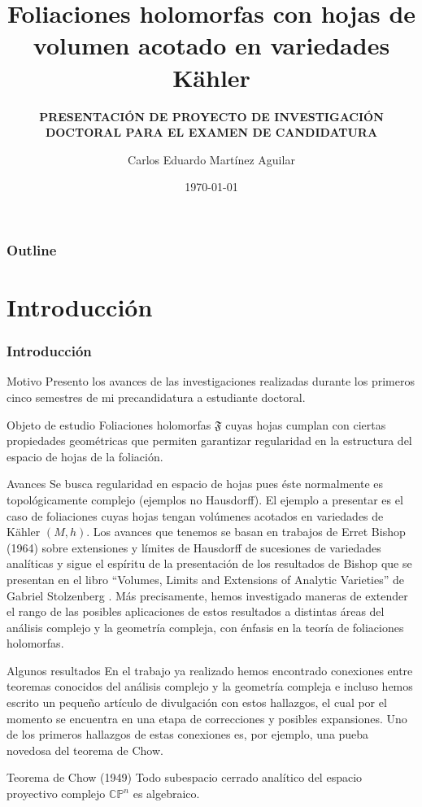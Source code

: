 \documentclass[letterpaper]{beamer}
\title{Foliaciones holomorfas con hojas de volumen acotado en variedades K\"ahler}
\subtitle{\textbf{PRESENTACI\'ON DE PROYECTO DE INVESTIGACI\'ON DOCTORAL PARA EL EXAMEN DE CANDIDATURA}}
\author{Carlos Eduardo Mart\'inez Aguilar}
\institute{UNIVERSIDAD NACIONAL AUTONOMA DE M\'EXICO}
\date{\today}
\newcommand{\cp}{\ensuremath{\mathbb{CP}}}
\begin{document}
\begin{frame}
  \frametitle{}
  \titlepage
\end{frame}

\begin{frame}
\frametitle{Outline}
\tableofcontents
\end{frame}

\section{Introducci\'on}
\begin{frame}
\frametitle{Introducci\'on}
\begin{block}{Motivo}
Presento los avances de las investigaciones realizadas durante los primeros cinco semestres
de mi precandidatura a estudiante doctoral.
\end{block}
\begin{block}{Objeto de estudio} Foliaciones holomorfas $\mathfrak{F}$ cuyas hojas cumplan con ciertas propiedades geom\'etricas que permiten garantizar regularidad en la estructura del espacio de hojas de la foliaci\'on.
\end{block}
\end{frame}

\begin{frame}
\begin{block}{Avances}
  Se busca regularidad en espacio de hojas pues \'este normalmente es topol\'ogicamente complejo (ejemplos no Hausdorff).
  El ejemplo a presentar es el caso de foliaciones cuyas hojas tengan vol\'umenes acotados en variedades de K\"ahler $(M,h)$.
  Los avances que tenemos se basan en trabajos de Erret Bishop \cite{Bishop} (1964) sobre extensiones y l\'imites de Hausdorff
  de sucesiones de variedades anal\'iticas y sigue el esp\'iritu de la presentaci\'on de los resultados de Bishop que se presentan en el
  libro ``Volumes, Limits and Extensions of Analytic Varieties'' de Gabriel Stolzenberg \cite{Stolzenberg}.
  M\'as precisamente, hemos investigado maneras de extender el rango de las posibles aplicaciones de estos resultados a
  distintas \'areas del an\'alisis complejo y la geometr\'ia compleja, con \'enfasis en la teor\'ia de foliaciones holomorfas.
\end{block}
\end{frame}

\begin{frame}
\begin{block}{Algunos resultados}
  En el trabajo ya realizado hemos encontrado conexiones entre teoremas conocidos del an\'alisis complejo y la geometr\'ia compleja e incluso hemos
  escrito un pequeño art\'iculo de divulgaci\'on con estos hallazgos, el cual por el momento se encuentra en una etapa de correcciones
  y posibles expansiones. Uno de los primeros hallazgos de estas conexiones es, por ejemplo, una pueba novedosa del teorema
  de Chow.
\end{block}
\begin{block}{Teorema de Chow (1949)}\label{Chow}
        Todo subespacio cerrado anal\'itico del espacio proyectivo complejo $\cp^{n}$ es algebraico.
\end{block}
\end{frame}
\end{document}
